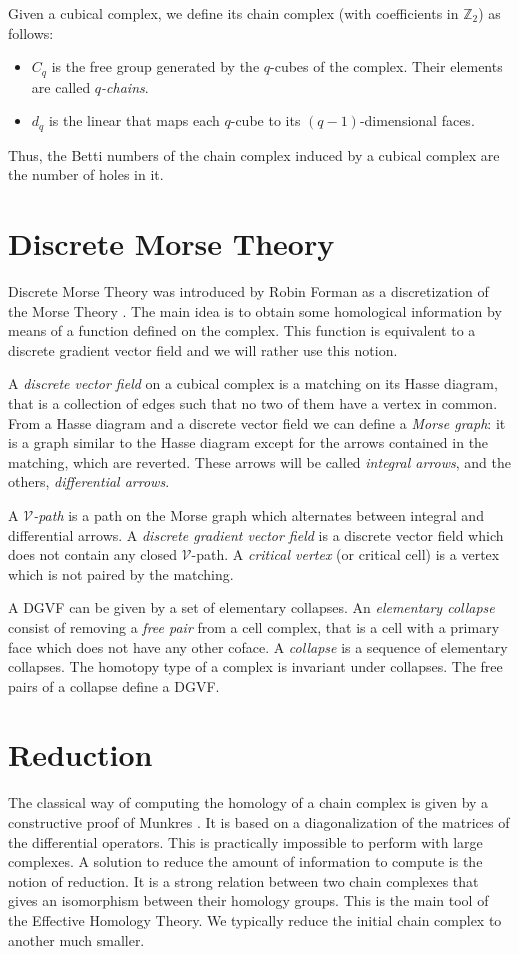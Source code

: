 \documentclass[10pt,a4paper]{report}
\begin{document}
Given a cubical complex, we define its chain complex (with coefficients in $\mathbb{Z}_2$) as follows: 
\begin{itemize}
\item $C_q$ is the free group generated by the $q$-cubes of the complex. Their elements are called \emph{$q$-chains}.
\item $d_q$ is the linear that maps each $q$-cube to its $(q-1)$-dimensional faces.
\end{itemize}
Thus, the Betti numbers of the chain complex induced by a cubical complex are the number of holes in it.

\section{Discrete Morse Theory}
Discrete Morse Theory was introduced by Robin Forman as a discretization of the Morse Theory \cite{Forman_2002}. The main idea is to obtain some homological information by means of a function defined on the complex. This function is equivalent to a discrete gradient vector field and we will rather use this notion.

A \emph{discrete vector field} on a cubical complex is a matching on its Hasse diagram, that is a collection of edges such that no two of them have a vertex in common. From a Hasse diagram and a discrete vector field we can define a \emph{Morse graph}: it is a graph similar to the Hasse diagram except for the arrows contained in the matching, which are reverted. These arrows will be called \emph{integral arrows}, and the others, \emph{differential arrows}.

A \emph{$\mathcal{V}$-path} is a path on the Morse graph which alternates between integral and differential arrows. A \emph{discrete gradient vector field} is a discrete vector field which does not contain any closed $\mathcal{V}$-path. A \emph{critical vertex} (or critical cell) is a vertex which is not paired by the matching. 

A DGVF can be given by a set of elementary collapses. An \emph{elementary collapse} \cite{Whitehead50} consist of removing a \emph{free pair} from a cell complex, that is a cell with a primary face which does not have any other coface. A \emph{collapse} is a sequence of elementary collapses. The homotopy type of a complex is invariant under collapses. The free pairs of a collapse define a DGVF.


\section{Reduction}\label{effective}
The classical way of computing the homology of a chain complex is given by a constructive proof of Munkres \cite{Munkres_1984}. It is based on a diagonalization of the matrices of the differential operators. This is practically impossible to perform with large complexes. A solution to reduce the amount of information to compute is the notion of reduction. It is a strong relation between two chain complexes that gives an isomorphism between their homology groups. This is the main tool of the Effective Homology Theory. We typically reduce the initial chain complex to another much smaller.
 
\end{document}
